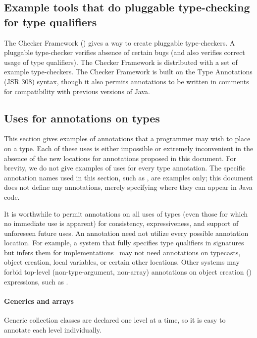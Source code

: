 \documentclass[10pt]{article}
\begin{document}
\subsection{Example tools that do pluggable type-checking for type qualifiers\label{type-qualifier-tools}}

The Checker Framework
()
gives a way to create pluggable type-checkers.  A pluggable type-checker
verifies absence of certain bugs (and also verifies correct usage of type
qualifiers).  The Checker Framework is distributed with a set of example
type-checkers.  The Checker Framework is built on the Type Annotations (JSR
308) syntax, though it also permits annotations to be written in comments
for compatibility with previous versions of Java.


\subsection{Uses for annotations on types\label{type-annotation-use-cases}}

This section gives examples of annotations that a programmer may wish to
place on a type.
Each of these uses is either impossible or extremely inconvenient in the
absence of the new locations for annotations proposed in this document.
For brevity, we do not give examples of uses for every type annotation.
The specific annotation names used in this
section, such as , are examples only; this document does not
define any annotations, merely specifying where they can appear in Java
code.


It is worthwhile to permit annotations on all uses of types (even those for
which no immediate use is apparent) for consistency, expressiveness, and
support of unforeseen future uses.
%
An annotation need not utilize every
possible annotation location.  For example, a system that fully specifies
type qualifiers in signatures but infers them for implementations~\cite{GreenfieldboyceF2005}
may not need annotations on typecasts, object creation, local variables, or
certain other locations.  Other
systems may forbid top-level (non-type-argument, non-array) annotations
on object creation () expressions, such as .


\paragraph{Generics and arrays\label{generics-and-arrays}}
Generic collection classes are
declared one level at a time, so it is easy to annotate each level
individually.
\end{document}
